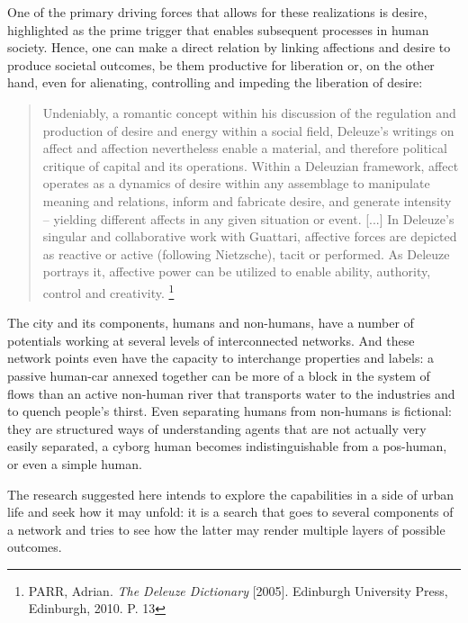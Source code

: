 One of the primary  driving forces that allows for  these realizations is desire, highlighted as the prime trigger that enables subsequent processes in human society. Hence, one can make a direct relation by linking affections and desire to produce societal outcomes, be them productive for liberation or, on the other hand, even for alienating, controlling and impeding the liberation of desire:

\begin{quote}
 Undeniably,  a romantic concept within his discussion of the regulation and production of desire and energy within a social field, Deleuze’s writings on affect and affection nevertheless enable a material, and therefore political critique of capital and its operations. Within a Deleuzian framework, affect operates as a dynamics of desire within any assemblage to manipulate meaning and relations, inform and fabricate desire, and generate intensity – yielding different affects in any given situation or event. [...] In Deleuze’s singular and collaborative work with Guattari, affective forces are depicted as reactive or active (following Nietzsche), tacit or performed. As Deleuze portrays it, affective power can be utilized to enable ability, authority, control and creativity.%
 \footnote{PARR, Adrian. \textit{The Deleuze Dictionary} [2005]. Edinburgh University Press, Edinburgh, 2010. P. 13}
 \end{quote}

The city and its components, humans and non-humans, have a number of potentials working at several levels of  interconnected networks. And these network points even have the capacity to interchange properties and labels: a passive human-car annexed together can be more of a block in the system of flows than an active non-human river that transports water to the industries and to quench people’s thirst. Even separating humans from non-humans is fictional: they are structured ways of understanding agents that are not actually very easily separated, a cyborg human becomes indistinguishable from a pos-human, or even a simple human.

The research suggested here intends to explore the capabilities in a side of urban life and seek how it may unfold: it is a search that goes to several components of a network and tries to see how the latter may render multiple layers of possible outcomes.